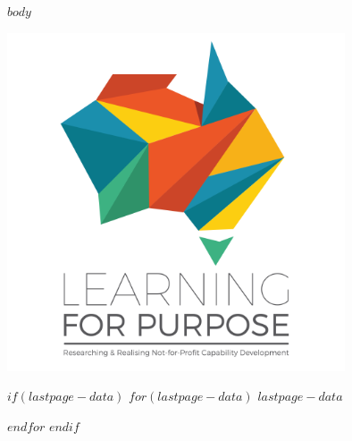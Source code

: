 \documentclass[11pt, a4paper]{article}
\begin{document}
\clearpage

\onehalfspacing
\raggedright

\newpage

$body$

\clearpage

{
	\thispagestyle{empty}
	\centering
	\includegraphics[width=0.75\textwidth]{LFP_vertical_tagline.png}
	\setlength{\parskip}{.5ex}
	
	\vfill

	\footnotesize
	$if(lastpage-data)$
		$for(lastpage-data)$
			$lastpage-data$ \par
		$endfor$
	$endif$
}
\end{document}
